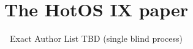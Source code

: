 \documentclass[letterpaper,twocolumn,10pt]{article}
\begin{document}

\title{\Large \bf The HotOS IX paper}

\author{Exact Author List TBD (single blind process)}


\maketitle

\thispagestyle{empty}





\end{document}
